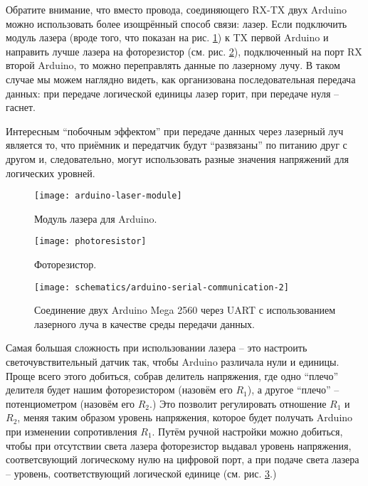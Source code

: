 \documentclass[../sparc.tex]{subfiles}
\begin{document}
Обратите внимание, что вместо провода, соединяющего RX-TX двух Arduino можно
использовать более изощрённый способ связи: лазер. Если подключить модуль лазера
(вроде того, что показан на рис. \ref{fig:arduino-laser-module}) к TX первой
Arduino и направить лучше лазера на фоторезистор (см. рис.
\ref{fig:photoresistor}), подключенный на порт RX второй Arduino, то можно
переправлять данные по лазерному лучу. В таком случае мы можем наглядно видеть,
как организована последовательная передача данных: при передаче логической
единицы лазер горит, при передаче нуля -- гаснет.

Интересным ``побочным эффектом'' при передаче данных через лазерный луч является
то, что приёмник и передатчик будут ``развязаны'' по питанию друг с другом и,
следовательно, могут использовать разные значения напряжений для логических
уровней.

\begin{figure}[ht]
  \centering
  \texttt{[image: arduino-laser-module]}
  \caption{Модуль лазера для Arduino.}
  \label{fig:arduino-laser-module}
\end{figure}

\begin{figure}[ht]
  \centering
  \texttt{[image: photoresistor]}
  \caption{Фоторезистор.}
  \label{fig:photoresistor}
\end{figure}

\begin{figure}[H]
  \centering
  \texttt{[image: schematics/arduino-serial-communication-2]}
  \caption{Соединение двух Arduino Mega 2560 через UART с использованием
    лазерного луча в качестве среды передачи данных.}
  \label{fig:arduino-serial-communication-2}
\end{figure}


Самая большая сложность при использовании лазера -- это настроить
светочувствительный датчик так, чтобы Arduino различала нули и единицы.  Проще
всего этого добиться, собрав делитель напряжения, где одно ``плечо'' делителя
будет нашим фоторезистором (назовём его $R_1$), а другое ``плечо'' --
потенциометром (назовём его $R_2$.)  Это позволит регулировать отношение $R_1$ и
$R_2$, меняя таким образом уровень напряжения, которое будет получать Arduino
при изменении сопротивления $R_1$.  Путём ручной настройки можно добиться, чтобы
при отсутствии света лазера фоторезистор выдавал уровень напряжения,
соответсвующий логическому нулю на цифровой порт, а при подаче света лазера --
уровень, соответствующий логической единице
(см. рис. \ref{fig:arduino-serial-communication-2}.)
\end{document}
